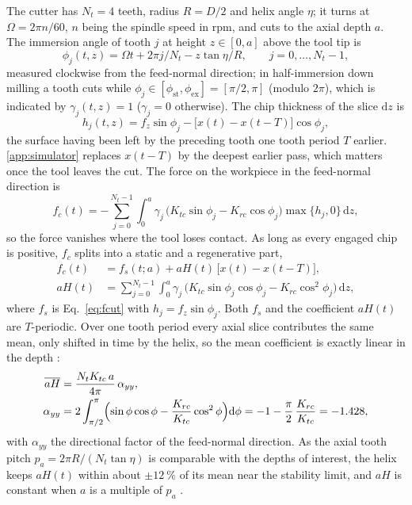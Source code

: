 The cutter has $N_t=4$ teeth, radius $R=D/2$ and helix angle $\eta$; it turns at $\Omega=2\pi n/60$, $n$ being the spindle speed in rpm, and cuts to the axial depth $a$. The immersion angle of tooth $j$ at height $z\in[0,a]$ above the tool tip is
\begin{equation}\label{eq:phi}
  \phi_j(t,z)=\Omega t+2\pi j/N_t-z\tan\eta/R ,\qquad j=0,\dots,N_t-1,
\end{equation}
measured clockwise from the feed-normal direction; in half-immersion down milling a tooth cuts while $\phi_j\in[\phi_{\mathrm{st}},\phi_{\mathrm{ex}}]=[\pi/2,\pi]$ (modulo $2\pi$), which is indicated by $\gamma_j(t,z)=1$ ($\gamma_j=0$ otherwise). The chip thickness of the slice $\mathrm dz$ is
\begin{equation}\label{eq:chip}
  h_j(t,z)=f_z\sin\phi_j-\bigl[x(t)-x(t-T)\bigr]\cos\phi_j ,
\end{equation}
the surface having been left by the preceding tooth one tooth period $T$ earlier. \ref{app:simulator} replaces $x(t-T)$ by the deepest earlier pass, which matters once the tool leaves the cut. The force on the workpiece in the feed-normal direction is
\begin{equation}\label{eq:fcut}
  f_c(t)=-\sum_{j=0}^{N_t-1}\int_0^a\gamma_j\,\bigl(K_{tc}\sin\phi_j-K_{rc}\cos\phi_j\bigr)\max\{h_j,0\}\,\mathrm dz ,
\end{equation}
so the force vanishes where the tool loses contact. As long as every engaged chip is positive, $f_c$ splits into a static and a regenerative part,
\begin{align}
  f_c(t)&=f_s(t;a)+aH(t)\,\bigl[x(t)-x(t-T)\bigr],\label{eq:split}\\
  aH(t)&=\sum_{j=0}^{N_t-1}\int_0^a\gamma_j\,\bigl(K_{tc}\sin\phi_j\cos\phi_j-K_{rc}\cos^2\phi_j\bigr)\,\mathrm dz ,\label{eq:aHt}
\end{align}
where $f_s$ is Eq.~\eqref{eq:fcut} with $h_j=f_z\sin\phi_j$. Both $f_s$ and the coefficient $aH(t)$ are $T$-periodic. Over one tooth period every axial slice contributes the same mean, only shifted in time by the helix, so the mean coefficient is exactly linear in the depth \citep{altintas1995analytical}:
\begin{equation}\label{eq:aHmean}
  \begin{aligned}
    \overline{aH}&=\frac{N_tK_{tc}\,a}{4\pi}\,\alpha_{yy},\\
    \alpha_{yy}&=2\int_{\pi/2}^{\pi}\Bigl(\sin\phi\cos\phi-\frac{K_{rc}}{K_{tc}}\cos^2\phi\Bigr)\mathrm d\phi
    =-1-\frac{\pi}{2}\,\frac{K_{rc}}{K_{tc}}=-1.428 ,
  \end{aligned}
\end{equation}
with $\alpha_{yy}$ the directional factor of the feed-normal direction. As the axial tooth pitch $p_a=2\pi R/(N_t\tan\eta)$ is comparable with the depths of interest, the helix keeps $aH(t)$ within about $\pm\SI{12}{\percent}$ of its mean near the stability limit, and $aH$ is constant when $a$ is a multiple of $p_a$ \citep{zatarain2006helix,insperger2006helix}.

